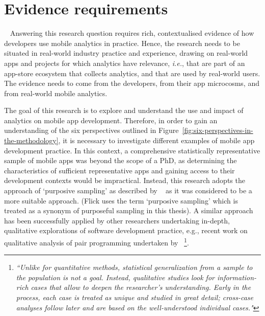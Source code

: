 \section{Evidence requirements}~\label{methodology-evidence-requirements}
Answering this research question requires rich, contextualised evidence of how developers use mobile analytics in practice.  
Hence, the research needs to be situated in real-world industry practice and experience, drawing on real-world apps and projects for which analytics have relevance, \textit{i.e.}, that are part of an app-store ecosystem that collects analytics, and that are used by real-world users. The evidence needs to come from the developers, from their app microcosms, and from real-world mobile analytics.




The goal of this research is to explore and understand the use and impact of analytics on mobile app development. %
Therefore, in order to gain an understanding of the six perspectives outlined in Figure~\ref{fig:six-perspectives-in-the-methodology}, it is necessary to investigate different examples of mobile app development practice. In this context, a comprehensive statistically representative sample of mobile apps was beyond the scope of a PhD, as determining the characteristics of sufficient representative apps and gaining access to their development contexts would be impractical. Instead, this research adopts the approach of `purposive sampling'  as described by ~\citep[pp180-182]{flick2018_an_introduction_to_qualitative_research_sixth_ed} as it was considered to be a more suitable approach. (Flick uses the term `purposive sampling' which is treated as a synonym of purposeful sampling in this thesis). A similar approach has been successfully applied by other researchers undertaking in-depth, qualitative explorations of software development practice, e.g., recent work on qualitative analysis of pair programming undertaken by ~\citep[p.114]{zieris2020_phd_qualitative_analysis_of_knowledge_transfer_in_pair_programming}\footnote{\emph{``Unlike for quantitative methods, statistical generalization from a sample to the population is not a goal. Instead, qualitative studies look for information-rich cases that allow to deepen the researcher’s understanding. Early in the process, each case is treated as unique and studied in great detail; cross-case analyses follow later and are based on the well-understood individual cases."}}. 

